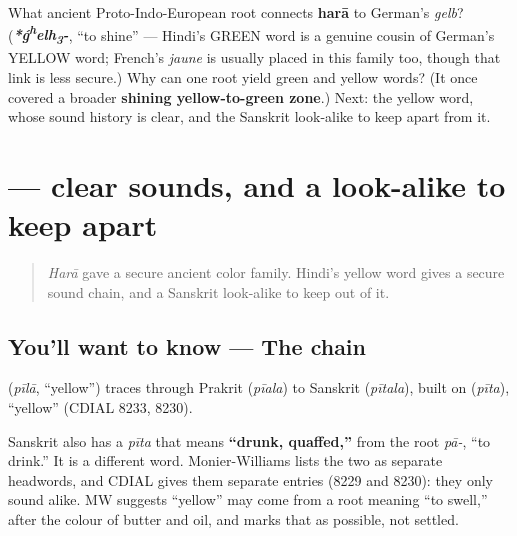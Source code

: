 \begin{tcolorbox}[breakable,colback=teal!4,colframe=teal!35!black,title={Before you move on}]
What ancient Proto-Indo-European root connects \textbf{harā} to German's \emph{gelb}? (\emph{\textbf{*ǵ\textsuperscript{h}elh\textsubscript{3}-}}, \textquotedblleft{}to shine\textquotedblright{} — Hindi's GREEN word is a genuine cousin of German's YELLOW word; French's \emph{jaune} is usually placed in this family too, though that link is less secure.) Why can one root yield green and yellow words? (It once covered a broader \textbf{shining yellow-to-green zone}.) Next: the yellow word, whose sound history is clear, and the Sanskrit look-alike to keep apart from it.
\end{tcolorbox}
\section[\texorpdfstring{\hi{पीला} (pīlā)}{पीला (pīlā)}]{ — clear sounds, and a look-alike to keep apart}

\label{lesson:HI-C24-pila-history}



\begin{quote}
\emph{Harā} gave a secure ancient color family. Hindi's yellow word gives a secure sound chain, and a Sanskrit look-alike to keep out of it.
\end{quote}

\subsection*{You'll want to know — The chain}
\textbf{} (\emph{pīlā}, \textquotedblleft{}yellow\textquotedblright{}) traces through Prakrit \textbf{} (\emph{pīala}) to Sanskrit \textbf{} (\emph{pītala}), built on \textbf{} (\emph{pīta}), \textquotedblleft{}yellow\textquotedblright{} (CDIAL 8233, 8230).

Sanskrit also has a \emph{pīta} that means \textbf{\textquotedblleft{}drunk, quaffed,\textquotedblright{}} from the root \emph{pā-}, \textquotedblleft{}to drink.\textquotedblright{} It is a different word. Monier-Williams lists the two as separate headwords, and CDIAL gives them separate entries (8229 and 8230): they only sound alike. MW suggests \textquotedblleft{}yellow\textquotedblright{} may come from a root meaning \textquotedblleft{}to swell,\textquotedblright{} after the colour of butter and oil, and marks that as possible, not settled.

